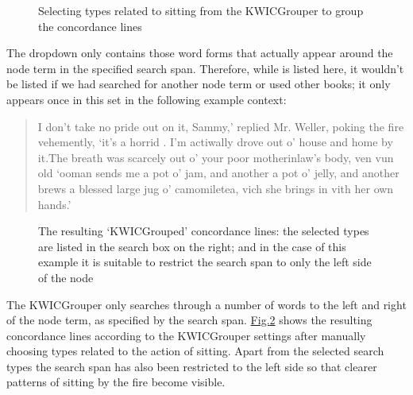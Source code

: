 \documentclass[letterpaper,10pt,english]{sphinxmanual}
\begin{document}
\begin{figure}[htbp]
\centering
\capstart

\noindent{}
\caption{Selecting types related to sitting from the KWICGrouper
to group the concordance lines}\label{\detokenize{clicanalysis/concordance:id16}}\label{\detokenize{clicanalysis/concordance:figure-analysis-concordance-kwicgrouper-firetypes}}\end{figure}

\sphinxAtStartPar
The dropdown only contains those word forms that actually appear
around the node term in the specified search span. Therefore, while
 is listed here, it wouldn’t be listed if we had searched
for another node term or used other books; it only appears once in this
set in the following example context:
\begin{quote}

\sphinxAtStartPar
I don’t take no pride out on it, Sammy,’ replied Mr. Weller, poking
the fire vehemently, ‘it’s a horrid . I’m actiwally
drove out o’ house and home by it.The breath was scarcely out o’ your
poor mother\sphinxhyphen{}in\sphinxhyphen{}law’s body, ven vun old ‘ooman sends me a pot o’ jam,
and another a pot o’ jelly, and another brews a blessed large jug o’
camomile\sphinxhyphen{}tea, vich she brings in vith her own hands.’

\sphinxAtStartPar
{}
\end{quote}

\begin{figure}[htbp]
\centering
\capstart

\noindent{}
\caption{The resulting ‘KWICGrouped’ concordance lines: the
selected types are listed in the search box on the right; and in the
case of this example it is suitable to restrict the search span to
only the left side of the node}\label{\detokenize{clicanalysis/concordance:id17}}\label{\detokenize{clicanalysis/concordance:figure-analysis-concordance-kwicgrouper-fireresults}}\end{figure}

\sphinxAtStartPar
The KWICGrouper only searches through a number of words to the left and
right of the node term, as specified by the search span.
\hyperref[\detokenize{clicanalysis/concordance:figure-analysis-concordance-kwicgrouper-fireresults}]{Fig.\@ \ref{\detokenize{clicanalysis/concordance:figure-analysis-concordance-kwicgrouper-fireresults}}} shows
the resulting concordance lines according to the KWICGrouper settings
after manually choosing types related to the action of sitting. Apart
from the selected search types the search span has also been restricted
to the left side so that clearer patterns of sitting by the fire become
visible.
\end{document}
